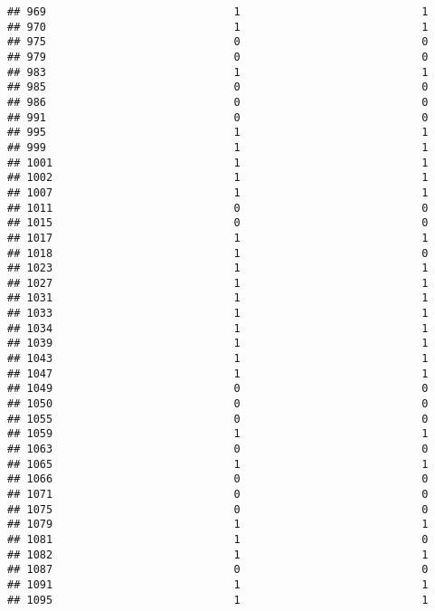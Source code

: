 \documentclass[
]{article}
\begin{document}
\begin{verbatim}
## 969                             1                            1
## 970                             1                            1
## 975                             0                            0
## 979                             0                            0
## 983                             1                            1
## 985                             0                            0
## 986                             0                            0
## 991                             0                            0
## 995                             1                            1
## 999                             1                            1
## 1001                            1                            1
## 1002                            1                            1
## 1007                            1                            1
## 1011                            0                            0
## 1015                            0                            0
## 1017                            1                            1
## 1018                            1                            0
## 1023                            1                            1
## 1027                            1                            1
## 1031                            1                            1
## 1033                            1                            1
## 1034                            1                            1
## 1039                            1                            1
## 1043                            1                            1
## 1047                            1                            1
## 1049                            0                            0
## 1050                            0                            0
## 1055                            0                            0
## 1059                            1                            1
## 1063                            0                            0
## 1065                            1                            1
## 1066                            0                            0
## 1071                            0                            0
## 1075                            0                            0
## 1079                            1                            1
## 1081                            1                            0
## 1082                            1                            1
## 1087                            0                            0
## 1091                            1                            1
## 1095                            1                            1

\end{verbatim}
\end{document}
